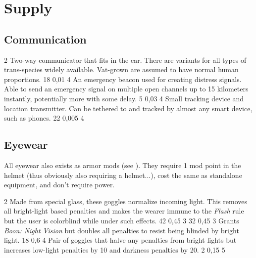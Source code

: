 	\section{Supply}
\subsection{Communication}
\vspace{10mm}
\begin{multicols}{2}
    {Two-way communicator that fits in the ear.
        There are variants for all types of trans-species widely available.
        Vat-grown are assumed to have normal human proportions.}
    {18}
    {0,01}
    {4}
    {An emergency beacon used for creating distress signals.
        Able to send an emergency signal on multiple open channels up to 15 kilometers instantly,
        potentially more with some delay.}
    {5}
    {0,03}
    {4}
    {Small tracking device and location transmitter.
        Can be tethered to and tracked by almost any smart device, such as phones.}
    {22}
    {0,005}
    {4}
\end{multicols}

\subsection{Eyewear}
\vspace{5mm}
\begin{exampleblock}
	All eyewear also exists as armor mods (see \pageref{subsec:armormod}).
	They require 1 mod point in the helmet
	(thus obviously also requiring a helmet...),
	cost the same as standalone equipment,
	and don't require power.
\end{exampleblock}
\vspace{5mm}
\begin{multicols}{2}
    {Made from special glass, these goggles normalize incoming light.
        This removes all bright-light based penalties
        and makes the wearer immune to the \emph{Flash} rule
        but the user is colorblind while under such effects.}
    {42}
    {0,45}
    {3}
    {32}
    {0,45}
    {3}
    {Grants \emph{Boon: Night Vision} but doubles all penalties to resist being blinded by bright light.}
    {18}
    {0,6}
    {4}
    {Pair of goggles that halve any penalties from bright lights
        but increases low-light penalties by 10 and darkness penalties by 20.}
    {2}
    {0,15}
    {5}
\end{multicols}

